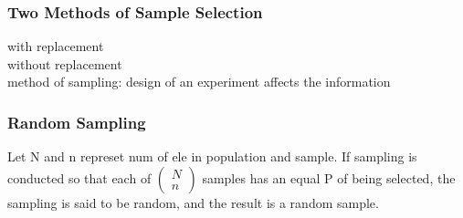 \documentclass[12pt]{article}
\begin{document}
    \subsubsection{Two Methods of Sample Selection}
        with replacement \\
        without replacement\\
        method of sampling: design of an experiment affects the information
    \subsubsection{Random Sampling}
        Let N and n represet num of ele in population and sample.
        If sampling is conducted so that each of $ \begin{pmatrix}
        N\\n\end{pmatrix}$ samples has an equal P of being selected, the
        sampling is said to be random, and the result is a random sample.
        

        
\end{document}
